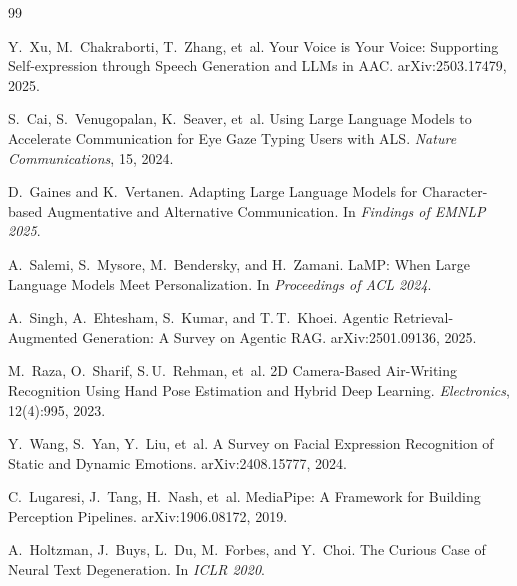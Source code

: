 \documentclass[10pt,letterpaper]{article}
\begin{document}
\renewcommand{\refname}{References}
\begin{thebibliography}{99}\footnotesize\itemsep=2pt

Y.~Xu, M.~Chakraborti, T.~Zhang, et~al.
\newblock Your Voice is Your Voice: Supporting Self-expression through
  Speech Generation and LLMs in AAC.
\newblock arXiv:2503.17479, 2025.

S.~Cai, S.~Venugopalan, K.~Seaver, et~al.
\newblock Using Large Language Models to Accelerate Communication for Eye
  Gaze Typing Users with ALS.
\newblock \textit{Nature Communications}, 15, 2024.

D.~Gaines and K.~Vertanen.
\newblock Adapting Large Language Models for Character-based Augmentative
  and Alternative Communication.
\newblock In \textit{Findings of EMNLP 2025}.

A.~Salemi, S.~Mysore, M.~Bendersky, and H.~Zamani.
\newblock LaMP: When Large Language Models Meet Personalization.
\newblock In \textit{Proceedings of ACL 2024}.

A.~Singh, A.~Ehtesham, S.~Kumar, and T.\,T.~Khoei.
\newblock Agentic Retrieval-Augmented Generation: A Survey on Agentic RAG.
\newblock arXiv:2501.09136, 2025.

M.~Raza, O.~Sharif, S.\,U.~Rehman, et~al.
\newblock 2D Camera-Based Air-Writing Recognition Using Hand Pose
  Estimation and Hybrid Deep Learning.
\newblock \textit{Electronics}, 12(4):995, 2023.

Y.~Wang, S.~Yan, Y.~Liu, et~al.
\newblock A Survey on Facial Expression Recognition of Static and Dynamic
  Emotions.
\newblock arXiv:2408.15777, 2024.

C.~Lugaresi, J.~Tang, H.~Nash, et~al.
\newblock MediaPipe: A Framework for Building Perception Pipelines.
\newblock arXiv:1906.08172, 2019.

A.~Holtzman, J.~Buys, L.~Du, M.~Forbes, and Y.~Choi.
\newblock The Curious Case of Neural Text Degeneration.
\newblock In \textit{ICLR 2020}.

\end{thebibliography}
\end{document}
